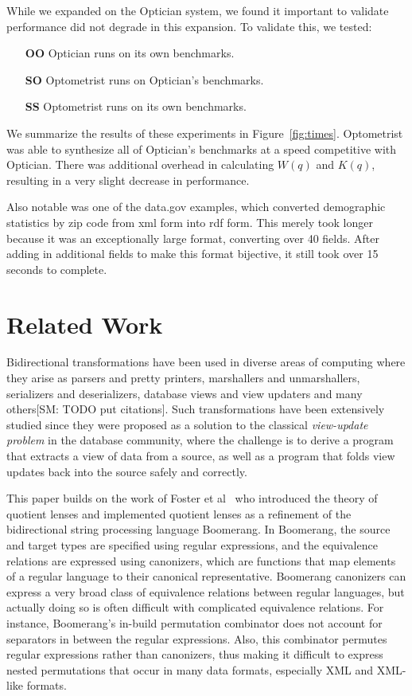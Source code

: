 \documentclass{svproc}
\newcommand{\FINISH}[3]{\ifdraft\textcolor{#1}{[#2: #3]}\fi}
\newcommand{\sam}[1]{\FINISH{dkpurple}{SM}{#1}}
\newcommand{\Name}{Optometrist}
\newcommand{\OpticianRuntime}{\textbf{OO}}
\newcommand{\SystemOnOptician}{\textbf{SO}}
\newcommand{\SystemOnBenchmarks}{\textbf{SS}}
\begin{document}
While we expanded on the Optician system, we found it important to validate
performance did not degrade in this expansion.  To validate this, we tested:
\begin{itemize}
\item[\OpticianRuntime{}] Optician runs on its own benchmarks.
\item[\SystemOnOptician{}] \Name{} runs on Optician's benchmarks.
\item[\SystemOnBenchmarks{}] \Name{} runs on its own benchmarks.
\end{itemize}

We summarize the results of these experiments in Figure~\ref{fig:times}.
\Name{} was
able to synthesize all of Optician's benchmarks at a speed competitive with
Optician.  There was additional overhead in calculating $W(q)$ and $K(q)$,
resulting in a very slight decrease in performance.

Also notable was one of the data.gov examples, which converted demographic
statistics by zip code from xml form into rdf form.  This merely took longer because it was
an exceptionally large format, converting over 40 fields.  After adding in additional
fields to make this format bijective, it still took over 15 seconds to complete.

\section{Related Work}
\label{relwork} 

Bidirectional transformations have been used in diverse areas of computing
where they arise as parsers and pretty printers, marshallers
and unmarshallers, serializers and deserializers, database views and view
updaters and many others\sam{TODO put citations}. Such transformations have
been extensively studied since they were proposed as a solution to the classical
{\em view-update problem} in the database community, where the challenge is to
derive a program that extracts a view of data from a source, as well as a
program that folds view updates back into the source safely and correctly.

This paper builds on the work of Foster et al~\cite{quotientlenses} who
introduced the theory of quotient lenses and implemented quotient lenses as a
refinement of the bidirectional string processing language Boomerang.
In Boomerang, the source and target types are specified using regular
expressions, and the equivalence relations are expressed using canonizers, which
are functions that map elements of a regular language to their canonical
representative. Boomerang canonizers can express a very broad class of
equivalence relations between regular languages, but actually doing so is often
difficult with complicated equivalence relations. For instance, Boomerang's
in-build permutation combinator does not account for separators in between the
regular expressions. Also, this combinator permutes regular expressions rather
than canonizers, thus making it difficult to express nested permutations that
occur in many data formats, especially XML and XML-like formats.
\end{document}
